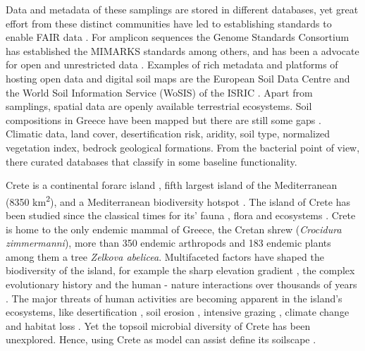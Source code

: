Data and metadata of these samplings are stored in different databases, yet 
great effort from these distinct communities have led to establishing standards
to enable FAIR data \parencite{wilkinson2016the-fair}. For amplicon sequences the Genome Standards
Consortium \parencite{Field2011} has established the MIMARKS \parencite{yilmaz2011minimum}
standards among others, and has been a advocate for open and unrestricted data \parencite{Amann2019}.
Examples of rich metadata and platforms of hosting open data and digital soil maps are the 
European Soil Data Centre \parencite{Panagos2022} and the World Soil Information
Service (WoSIS) of the ISRIC \parencite{Batjes2024}. Apart from samplings,
spatial data are openly available terrestrial ecosystems. Soil compositions in Greece 
have been mapped but there are still some gaps \parencite{yassoglou2017soils}.
Climatic data, land cover, desertification risk, aridity, soil type, normalized
vegetation index, bedrock geological formations. From the bacterial point of view, 
there curated databases that classify in some baseline functionality. 

Crete is a continental forarc island \parencite{ali2016}, fifth largest island of the Mediterranean (8350 km\textsuperscript{2}),
and a Mediterranean biodiversity hotspot \parencite{myers2000biodiversity}.
The island of Crete has been studied since the classical times for its'
fauna \parencite{Sidiropoulos_Polymeni_Legakis_2017,Anastasiou2018Tenebrionid}, flora \parencite{Krimbas_2005} and ecosystems \parencite{Grove1993}.
Crete is home to the only endemic mammal of Greece, the Cretan shrew (\textit{Crocidura zimmermanni}),
more than 350 endemic arthropods \parencite{bolanakis2024} and 183 endemic plants \parencite{Kougioumoutzis2020}
among them a tree \textit{Zelkova abelicea}. Multifaceted factors have shaped the
biodiversity of the island, for example the sharp elevation gradient \parencite{trigas2013elevational, FAZAN2017},
the complex evolutionary history \parencite{POULAKAKIS2002} and the human - nature
interactions over thousands of years \parencite{Vogiatzakis2008_med, Sfenthourakis2017}.
The major threats of human activities are becoming apparent in the island's ecosystems,
like desertification \parencite{KARAMESOUTI2018266}, soil erosion \parencite{PANAGOS2014147, su14052738}, intensive grazing \parencite{JouffroyBapicot2016},
climate change \parencite{Kougioumoutzis2020,Vogiatzakis2016} and habitat loss \parencite{ISPIKOUDIS1993259}.
Yet the topsoil microbial diversity of Crete has been unexplored. Hence, using Crete as model can 
assist define its soilscape \parencite{LAGACHERIE2001105}.


